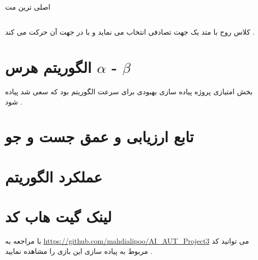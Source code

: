 \subsection{}
اصلی ترین مت
\subsection{}
کلاس روح با متد 
یک جهت تصادفی انتخاب می نماید و با 
در جهت آن حرکت می کند .
\section{الگوریتم هرس $\alpha$ - $\beta$}
بخش امتیازی پروژه پیاده سازی بهبودی برای سرعت الگوریتم بود که سعی شد پیاده شود .
\section{تابع ارزیابی و عمق جست و جو}
\section{عملکرد الگوریتم}
\section{لینک گیت هاب کد}
با مراجعه به 
\url{https://github.com/mahdialipoo/AI_AUT_Project3}
می توانید کد مربوط به پیاده سازی این بازی را مشاهده نمایید .
